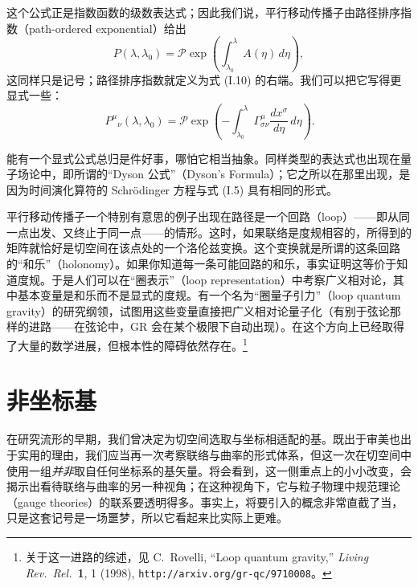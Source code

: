 这个公式正是指数函数的级数表达式；因此我们说，平行移动传播子由路径排序指数（path-ordered exponential）给出
\begin{equation*}
P(\lambda,\lambda_0) = \mathcal{P}\exp\left(\int_{\lambda_0}^{\lambda} A(\eta)\,d\eta\right),
\tag{I.11}
\end{equation*}
这同样只是记号；路径排序指数就定义为式 (I.10) 的右端。我们可以把它写得更显式一些：
\begin{equation*}
\boxed{\,P^\mu{}_\nu(\lambda,\lambda_0) = \mathcal{P}\exp\left(-\int_{\lambda_0}^{\lambda} \Gamma^\mu_{\sigma\nu}\frac{dx^\sigma}{d\eta}\,d\eta\right).}
\tag{I.12}
\end{equation*}

能有一个显式公式总归是件好事，哪怕它相当抽象。同样类型的表达式也出现在量子场论中，即所谓的“Dyson 公式”（Dyson's Formula）；它之所以在那里出现，是因为时间演化算符的 Schrödinger 方程与式 (I.5) 具有相同的形式。

平行移动传播子一个特别有意思的例子出现在路径是一个回路（loop）——即从同一点出发、又终止于同一点——的情形。这时，如果联络是度规相容的，所得到的矩阵就恰好是切空间在该点处的一个洛伦兹变换。这个变换就是所谓的这条回路的“和乐”（holonomy）。如果你知道每一条可能回路的和乐，事实证明这等价于知道度规。于是人们可以在“圈表示”（loop representation）中考察广义相对论，其中基本变量是和乐而不是显式的度规。有一个名为“圈量子引力”（loop quantum gravity）的研究纲领，试图用这些变量直接把广义相对论量子化（有别于弦论那样的进路——在弦论中，GR 会在某个极限下自动出现）。在这个方向上已经取得了大量的数学进展，但根本性的障碍依然存在。\footnote{关于这一进路的综述，见 C.~Rovelli, “Loop quantum gravity,” \emph{Living Rev.~Rel.}~\textbf{1}, 1 (1998), \texttt{http://arxiv.org/gr-qc/9710008}。}



\chapter{非坐标基}

在研究流形的早期，我们曾决定为切空间选取与坐标相适配的基。既出于审美也出于实用的理由，我们应当再一次考察联络与曲率的形式体系，但这一次在切空间中使用一组\emph{并非}取自任何坐标系的基矢量。将会看到，这一侧重点上的小小改变，会揭示出看待联络与曲率的另一种视角；在这种视角下，它与粒子物理中规范理论（gauge theories）的联系要透明得多。事实上，将要引入的概念非常直截了当，只是这套记号是一场噩梦，所以它看起来比实际上更难。

